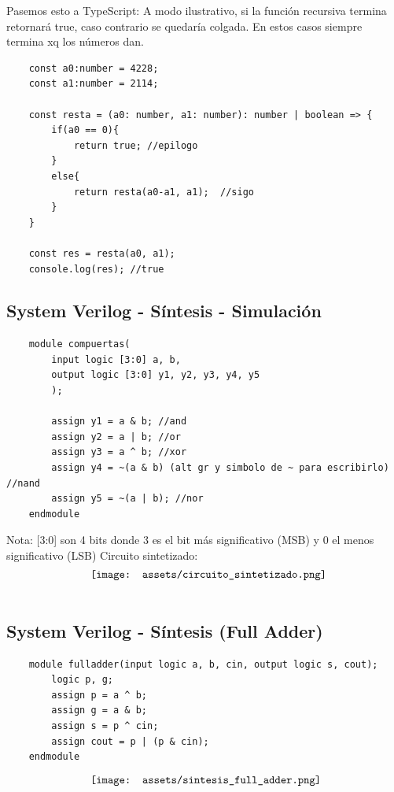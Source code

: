 \documentclass[10pt,a4paper]{article}
\begin{document}
Pasemos esto a TypeScript: A modo ilustrativo, si la función recursiva termina retornará true, caso contrario se quedaría colgada. En estos casos siempre termina xq los números dan.
\begin{lstlisting}
    const a0:number = 4228;
    const a1:number = 2114;

    const resta = (a0: number, a1: number): number | boolean => {
        if(a0 == 0){
            return true; //epilogo
        }
        else{
            return resta(a0-a1, a1);  //sigo
        }
    }

    const res = resta(a0, a1);
    console.log(res); //true
\end{lstlisting}
\subsection*{System Verilog - Síntesis - Simulación}
\label{subsec:SVL_S_S}
\begin{lstlisting}
    module compuertas(
        input logic [3:0] a, b,
        output logic [3:0] y1, y2, y3, y4, y5
        );

        assign y1 = a & b; //and
        assign y2 = a | b; //or
        assign y3 = a ^ b; //xor
        assign y4 = ~(a & b) (alt gr y simbolo de ~ para escribirlo) //nand
        assign y5 = ~(a | b); //nor
    endmodule 
\end{lstlisting}
Nota: [3:0] son 4 bits donde 3 es el bit más significativo (MSB) y 0 el menos significativo (LSB)
Circuito sintetizado:
\[\begin{minipage}[b]{0.6\textwidth}
    \texttt{[image: assets/circuito\_sintetizado.png]}
    \label{fig:circuito_sintetizado}
\end{minipage}\] 
\subsection*{System Verilog - Síntesis (Full Adder)}
\label{subsec:SVL_FullAdder}
\begin{lstlisting}
    module fulladder(input logic a, b, cin, output logic s, cout);
        logic p, g; 
        assign p = a ^ b;
        assign g = a & b;
        assign s = p ^ cin;
        assign cout = p | (p & cin);
    endmodule
\end{lstlisting}
\[\begin{minipage}[b]{0.6\textwidth}
\texttt{[image: assets/sintesis\_full\_adder.png]}
\label{fig:sintesis_full_adder}
\end{minipage}\] 
\end{document}
